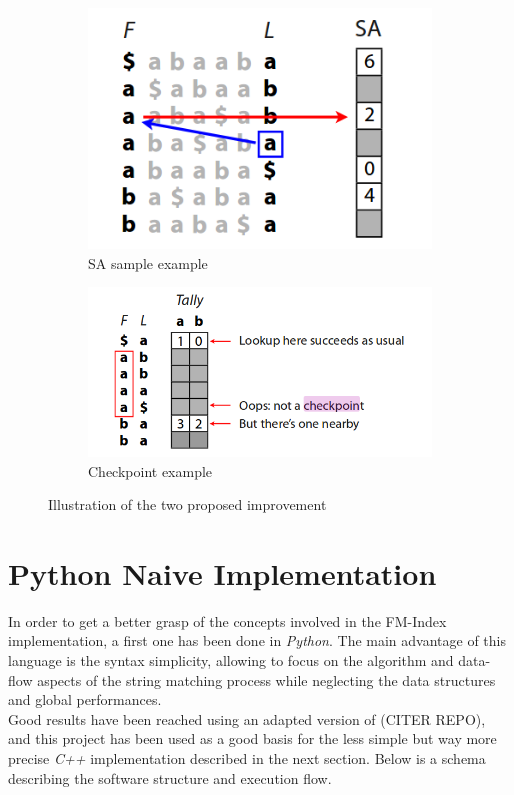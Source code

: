 		\begin{figure}[h]
			\centering
			\begin{subfigure}{.5\textwidth}
				\centering
				\includegraphics[width=.5\linewidth]{Figures/sa.png}
				\caption{SA sample example}
				\label{fig:sub1}
				\end{subfigure}%
				\begin{subfigure}{.5\textwidth}
					\centering
					\includegraphics[width=.8\linewidth]{Figures/CHECKPOINT.png}
					\caption{Checkpoint example}
					\label{fig:sub2}
					\end{subfigure}
					\caption{Illustration of the two proposed improvement}
					\label{fig:test}
					\end{figure}
									

\section{Python Naive Implementation}

In order to get a better grasp of the concepts involved in the FM-Index implementation, a first one has been done in \textsl{Python}. The main advantage of this language is the syntax simplicity, allowing to focus on the algorithm and data-flow aspects of the string matching process while neglecting the data structures and global performances. \\

Good results have been reached using an adapted version of (CITER REPO), and this project has been used as a good basis for the less simple but way more precise \textsl{C++} implementation described in the next section. Below is a schema describing the software structure and execution flow.


